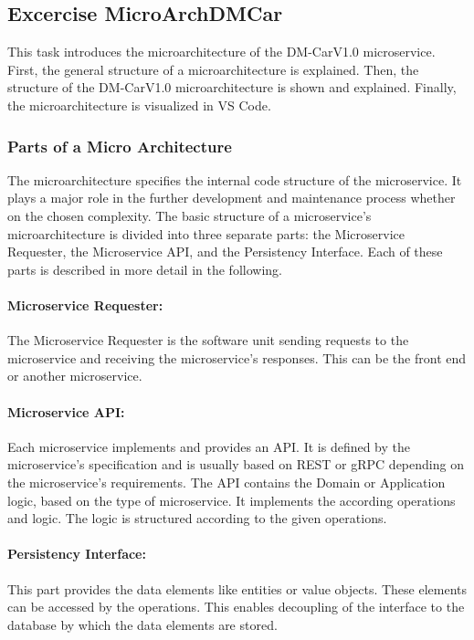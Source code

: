 \subsection{Excercise MicroArchDMCar}
This task introduces the microarchitecture of the DM-CarV1.0 microservice.
First, the general structure of a microarchitecture is explained.
Then, the structure of the DM-CarV1.0 microarchitecture is shown and explained.
Finally, the microarchitecture is visualized in VS Code.

\subsubsection*{Parts of a Micro Architecture}
The microarchitecture specifies the internal code structure of the microservice.
It plays a major role in the further development and maintenance process whether on the chosen complexity.
The basic structure of a microservice's microarchitecture is divided into three separate parts: the Microservice Requester, the Microservice API, and the Persistency Interface.
Each of these parts is described in more detail in the following.

\paragraph*{Microservice Requester:}
The Microservice Requester is the software unit sending requests to the microservice and receiving the microservice's responses.
This can be the front end or another microservice.

\paragraph*{Microservice API:}
Each microservice implements and provides an API.
It is defined by the microservice's specification and is usually based on REST or gRPC depending on the microservice's requirements.
The API contains the Domain or Application logic, based on the type of microservice.
It implements the according operations and logic.
The logic is structured according to the given operations.

\paragraph*{Persistency Interface:}
This part provides the data elements like entities or value objects.
These elements can be accessed by the operations.
This enables decoupling of the interface to the database by which the data elements are stored.

